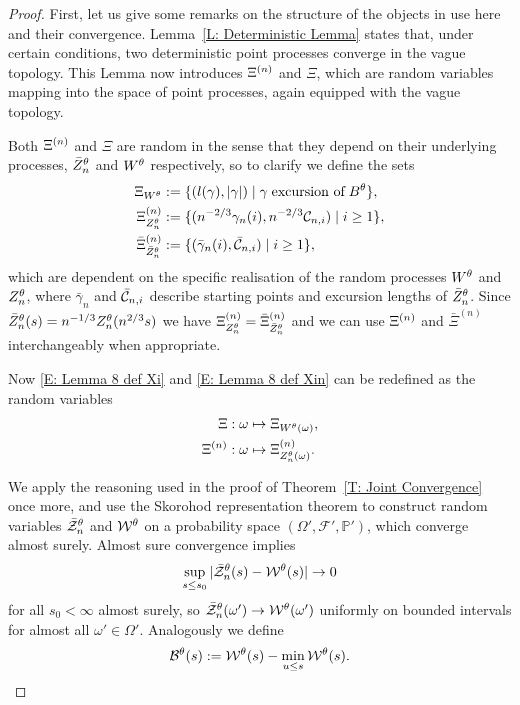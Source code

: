 \begin{proof}
	First, let us give some remarks on the structure of the objects in use here and their convergence.
	Lemma~\ref{L: Deterministic Lemma} states that, under certain conditions, two deterministic point processes converge in the vague topology.
	This Lemma now introduces $\Xi^{(n)}$ and $\Xi$, which are random variables mapping into the space of point processes, again equipped with the vague topology.
	
	Both $\Xi^{(n)}$ and $\Xi$ are random in the sense that they depend on their underlying processes, $\bar{Z}^{\theta}_n$ and $W^{\theta}$ respectively,
	so to clarify we define the sets
	\begin{equation} \label{E: Lemma 8 def XiWt}
	\begin{aligned}
	\Xi_{W^{\theta}} &:= \{ (l(\gamma), |\gamma|) \; | \; \gamma \; \text{excursion of} \; B^{\theta}\}, \\
	\Xi^{(n)}_{Z_n^{\theta}} &:= \{ ( n^{-2 / 3} \gamma_n(i), n^{-2 / 3} \mathcal{C}_{n,i} ) \; | \; i \geq 1 \}, \\
	\bar{\Xi}^{(n)}_{\bar{Z}^{\theta}_n} &:= \{ ( \bar{\gamma}_n(i), \bar{\mathcal{C}}_{n,i} ) \; | \; i \geq 1 \},
	\end{aligned}
	\end{equation}
	which are dependent on the specific realisation of the random processes $W^{\theta}$ and $Z_n^{\theta}$,
	where $\bar{\gamma}_n$ and $\bar{\mathcal{C}}_{n,i}$ describe starting points and excursion lengths of $\bar{Z}^{\theta}_n$.
	Since $\bar{Z}^{\theta}_n(s) = n^{-1 / 3}Z_n^{\theta}(n^{2 / 3}s)$ we have $\Xi^{(n)}_{Z_n^{\theta}} = \bar{\Xi}^{(n)}_{\bar{Z}^{\theta}_n}$
	and we can use $\Xi^{(n)}$ and $\bar{\Xi}^{(n)}$ interchangeably when appropriate.
	
	Now \eqref{E: Lemma 8 def Xi} and \eqref{E: Lemma 8 def Xin} can be redefined as the random variables
	\begin{equation} \label{E: Lemma 8 def Xi Xin}
	\begin{aligned}
	\Xi : \; &\omega \mapsto \Xi_{W^{\theta}(\omega)}, \\
	\Xi^{(n)} : \; &\omega \mapsto \Xi^{(n)}_{Z_n^{\theta}(\omega)}.
	\end{aligned}
	\end{equation}
	
	We apply the reasoning used in the proof of Theorem~\ref{T: Joint Convergence} once more,
	and use the Skorohod representation theorem to construct random variables
	$\bar{\mathcal{Z}}^{\theta}_n$ and $\mathcal{W}^{\theta}$ on a probability space $(\Omega', \mathcal{F}', \mathbb{P}')$,
	which converge almost surely.
	Almost sure convergence implies
	\begin{equation}
	\sup_{s \leq s_0}|\bar{\mathcal{Z}}^{\theta}_n(s) - \mathcal{W}^{\theta}(s)| \rightarrow 0
	\end{equation}
	for all $s_0 < \infty$ almost surely,
	so $\bar{\mathcal{Z}}^{\theta}_n(\omega') \rightarrow \mathcal{W}^{\theta}(\omega')$ uniformly on bounded intervals for almost all $\omega' \in \Omega'$. 
	Analogously we define
	\begin{equation}
		\mathcal{B}^{\theta}(s) := \mathcal{W}^{\theta}(s) - \min_{u \leq s}\mathcal{W}^{\theta}(s).
	\end{equation}
	

\end{proof}
